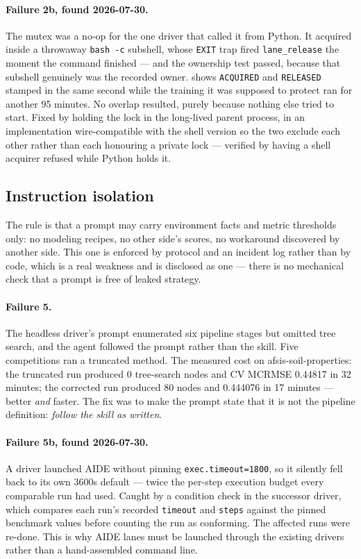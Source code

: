 \documentclass[11pt,a4paper]{article}
\begin{document}
\paragraph{Failure 2b, found 2026-07-30.} The mutex was a no-op for the one driver that called
it from Python. It acquired inside a throwaway \texttt{bash -c} subshell, whose \texttt{EXIT}
trap fired \texttt{lane\_release} the moment the command finished --- and the ownership test
passed, because that subshell genuinely was the recorded owner.  shows
\texttt{ACQUIRED} and \texttt{RELEASED} stamped in the same second while the training it was
supposed to protect ran for another 95 minutes. No overlap resulted, purely because nothing else
tried to start. Fixed by holding the lock in the long-lived parent process, in an implementation
wire-compatible with the shell version so the two exclude each other rather than each honouring a
private lock --- verified by having a shell acquirer refused while Python holds it.

\subsection{Instruction isolation}

The rule is that a prompt may carry environment facts and metric thresholds only: no modeling
recipes, no other side's scores, no workaround discovered by another side. This one is enforced
by protocol and an incident log rather than by code, which is a real weakness and is disclosed as
one --- there is no mechanical check that a prompt is free of leaked strategy.

\paragraph{Failure 5.} The headless driver's prompt enumerated six pipeline stages but omitted
tree search, and the agent followed the prompt rather than the skill. Five competitions ran a
truncated method. The measured cost on afsis-soil-properties: the truncated run produced 0
tree-search nodes and CV MCRMSE 0.44817 in 32 minutes; the corrected run produced 80 nodes and
0.444076 in 17 minutes --- better \emph{and} faster. The fix was to make the prompt state that it
is not the pipeline definition: \emph{follow the skill as written}.

\paragraph{Failure 5b, found 2026-07-30.} A driver launched AIDE without pinning
\texttt{exec.timeout=1800}, so it silently fell back to its own 3600s default --- twice the
per-step execution budget every comparable run had used. Caught by a condition check in the
successor driver, which compares each run's recorded \texttt{timeout} and \texttt{steps} against
the pinned benchmark values before counting the run as conforming. The affected runs were
re-done. This is why AIDE lanes must be launched through the existing drivers rather than a
hand-assembled command line.
\end{document}
